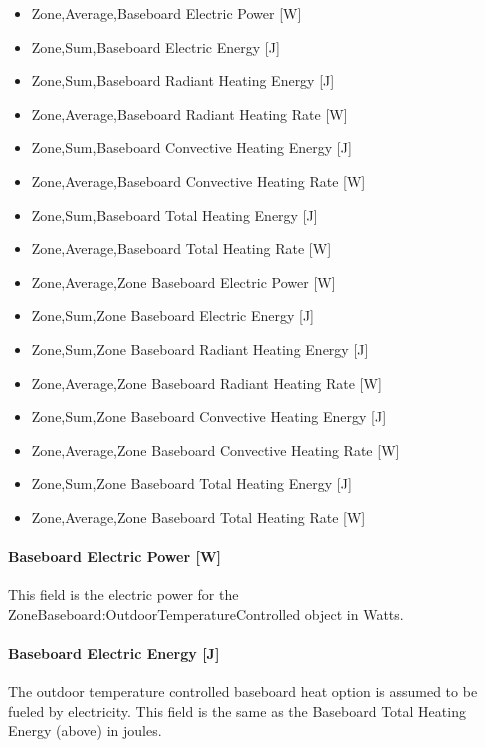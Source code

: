 \begin{itemize}
\tightlist
\item
  Zone,Average,Baseboard Electric Power {[}W{]}
\item
  Zone,Sum,Baseboard Electric Energy {[}J{]}
\item
  Zone,Sum,Baseboard Radiant Heating Energy {[}J{]}
\item
  Zone,Average,Baseboard Radiant Heating Rate {[}W{]}
\item
  Zone,Sum,Baseboard Convective Heating Energy {[}J{]}
\item
  Zone,Average,Baseboard Convective Heating Rate {[}W{]}
\item
  Zone,Sum,Baseboard Total Heating Energy {[}J{]}
\item
  Zone,Average,Baseboard Total Heating Rate {[}W{]}
\item
  Zone,Average,Zone Baseboard Electric Power {[}W{]}
\item
  Zone,Sum,Zone Baseboard Electric Energy {[}J{]}
\item
  Zone,Sum,Zone Baseboard Radiant Heating Energy {[}J{]}
\item
  Zone,Average,Zone Baseboard Radiant Heating Rate {[}W{]}
\item
  Zone,Sum,Zone Baseboard Convective Heating Energy {[}J{]}
\item
  Zone,Average,Zone Baseboard Convective Heating Rate {[}W{]}
\item
  Zone,Sum,Zone Baseboard Total Heating Energy {[}J{]}
\item
  Zone,Average,Zone Baseboard Total Heating Rate {[}W{]}
\end{itemize}

\paragraph{Baseboard Electric Power {[}W{]}}\label{baseboard-electric-power-w}

This field is the electric power for the ZoneBaseboard:OutdoorTemperatureControlled object in Watts.

\paragraph{Baseboard Electric Energy {[}J{]}}\label{baseboard-electric-energy-j}

The outdoor temperature controlled baseboard heat option is assumed to be fueled by electricity. This field is the same as the Baseboard Total Heating Energy (above) in joules.

